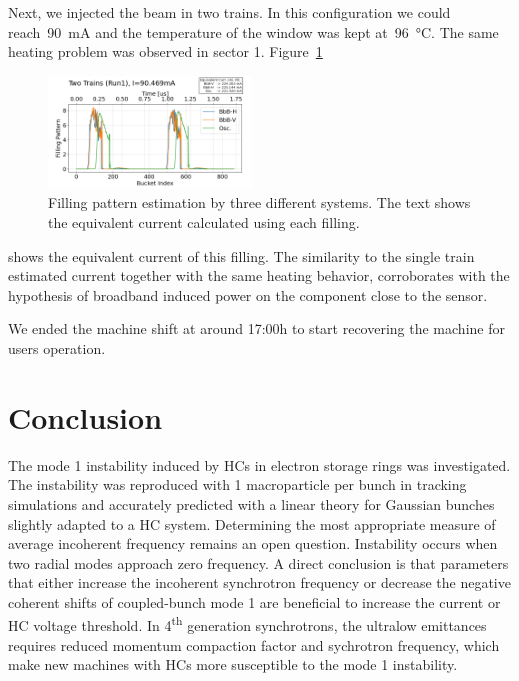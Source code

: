 \documentclass[a4paper,
               biblatex,     %
               ]{jacow}
\begin{document}
Next, we injected the beam in two trains. In this configuration we could reach~\SI{90}{\milli\ampere} and the temperature of the window was kept at~\SI{96}{\celsius}. The same heating problem was observed in sector 1. Figure~\ref{fig:2023-08-01_twotrains_fill}
\begin{figure}
    \centering
    \includegraphics[width=0.48\textwidth]{2023-08-01_trains2_run1_curr90p469.png}
    \caption{Filling pattern estimation by three different systems. The text shows the equivalent current calculated using each filling.}
    \label{fig:2023-08-01_twotrains_fill}
\end{figure}
shows the equivalent current of this filling. The similarity to the single train estimated current together with the same heating behavior, corroborates with the hypothesis of broadband induced power on the component close to the sensor.

We ended the machine shift at around 17:00h to start recovering the machine for users operation.

\section{Conclusion}
The mode 1 instability induced by HCs in electron storage rings was investigated. The instability was reproduced with 1 macroparticle per bunch in tracking simulations and accurately predicted with a linear theory for Gaussian bunches slightly adapted to a HC system. Determining the most appropriate measure of average incoherent frequency remains an open question. Instability occurs when two radial modes approach zero frequency. A direct conclusion is that parameters that either increase the incoherent synchrotron frequency or decrease the negative coherent shifts of coupled-bunch mode 1 are beneficial to increase the current or HC voltage threshold. In 4\textsuperscript{th} generation synchrotrons, the ultralow emittances requires reduced momentum compaction factor and sychrotron frequency, which make new machines with HCs more susceptible to the mode 1 instability.
\end{document}
